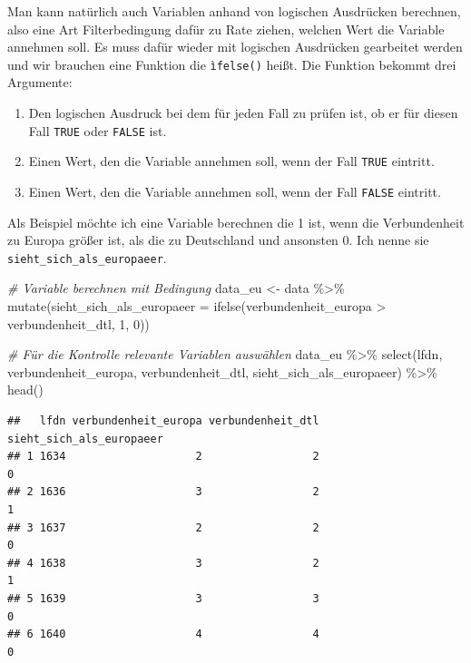 \documentclass[
]{book}
\newenvironment{Shaded}{\begin{snugshade}}{\end{snugshade}}
\newcommand{\AttributeTok}[1]{\textcolor[rgb]{0.77,0.63,0.00}{#1}}
\newcommand{\CommentTok}[1]{\textcolor[rgb]{0.56,0.35,0.01}{\textit{#1}}}
\newcommand{\DecValTok}[1]{\textcolor[rgb]{0.00,0.00,0.81}{#1}}
\newcommand{\FunctionTok}[1]{\textcolor[rgb]{0.00,0.00,0.00}{#1}}
\newcommand{\NormalTok}[1]{#1}
\newcommand{\OtherTok}[1]{\textcolor[rgb]{0.56,0.35,0.01}{#1}}
\newcommand{\SpecialCharTok}[1]{\textcolor[rgb]{0.00,0.00,0.00}{#1}}
\begin{document}
Man kann natürlich auch Variablen anhand von logischen Ausdrücken berechnen, also eine Art Filterbedingung dafür zu Rate ziehen, welchen Wert die Variable annehmen soll. Es muss dafür wieder mit logischen Ausdrücken gearbeitet werden und wir brauchen eine Funktion die \texttt{ìfelse()} heißt. Die Funktion bekommt drei Argumente:

\begin{enumerate}
\def\labelenumi{\arabic{enumi}.}
\item
  Den logischen Ausdruck bei dem für jeden Fall zu prüfen ist, ob er für diesen Fall \texttt{TRUE} oder \texttt{FALSE} ist.
\item
  Einen Wert, den die Variable annehmen soll, wenn der Fall \texttt{TRUE} eintritt.
\item
  Einen Wert, den die Variable annehmen soll, wenn der Fall \texttt{FALSE} eintritt.
\end{enumerate}

Als Beispiel möchte ich eine Variable berechnen die 1 ist, wenn die Verbundenheit zu Europa größer ist, als die zu Deutschland und ansonsten 0. Ich nenne sie \texttt{sieht\_sich\_als\_europaeer}.

\begin{Shaded}
\begin{Highlighting}[]
\CommentTok{\# Variable berechnen mit Bedingung}
\NormalTok{data\_eu }\OtherTok{\textless{}{-}}\NormalTok{ data }\SpecialCharTok{\%\textgreater{}\%} 
  \FunctionTok{mutate}\NormalTok{(}\AttributeTok{sieht\_sich\_als\_europaeer =} \FunctionTok{ifelse}\NormalTok{(verbundenheit\_europa }\SpecialCharTok{\textgreater{}}\NormalTok{ verbundenheit\_dtl, }\DecValTok{1}\NormalTok{, }\DecValTok{0}\NormalTok{)) }

\CommentTok{\# Für die Kontrolle relevante Variablen auswählen}
\NormalTok{data\_eu }\SpecialCharTok{\%\textgreater{}\%} 
  \FunctionTok{select}\NormalTok{(lfdn, verbundenheit\_europa, verbundenheit\_dtl, sieht\_sich\_als\_europaeer) }\SpecialCharTok{\%\textgreater{}\%}   \FunctionTok{head}\NormalTok{()}
\end{Highlighting}
\end{Shaded}

\begin{verbatim}
##   lfdn verbundenheit_europa verbundenheit_dtl sieht_sich_als_europaeer
## 1 1634                    2                 2                        0
## 2 1636                    3                 2                        1
## 3 1637                    2                 2                        0
## 4 1638                    3                 2                        1
## 5 1639                    3                 3                        0
## 6 1640                    4                 4                        0
\end{verbatim}
\end{document}
